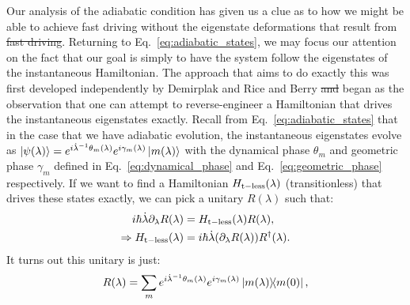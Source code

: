\documentclass[a4paper,oneside,11pt]{book}
\newcommand{\adj}[1]{#1^{\dagger}}
\newcommand{\dotlambda}{\dot{\lambda}}
\providecommand{\DIFaddtex}[1]{{\protect\color{blue}\uwave{#1}}} %
\providecommand{\DIFdeltex}[1]{{\protect\color{red}\sout{#1}}}                      %
\providecommand{\DIFaddbegin}{} %
\providecommand{\DIFaddend}{} %
\providecommand{\DIFdelbegin}{} %
\providecommand{\DIFdelend}{} %
\providecommand{\DIFadd}[1]{\texorpdfstring{\DIFaddtex{#1}}{#1}} %
\providecommand{\DIFdel}[1]{\texorpdfstring{\DIFdeltex{#1}}{}} %
\newcommand{\DIFscaledelfig}{0.5}
\newlength{\DIFdelgraphicswidth} %
\newlength{\DIFdelgraphicsheight} %
\newcommand{\DIFaddincludegraphics}[2][]{{\color{blue}\fbox{\DIFOincludegraphics[#1]{#2}}}} %
\newcommand{\DIFdelincludegraphics}[2][]{%
\sbox{\DIFdelgraphicsbox}{\DIFOincludegraphics[#1]{#2}}%
\settoboxwidth{\DIFdelgraphicswidth}{\DIFdelgraphicsbox} %
\settoboxtotalheight{\DIFdelgraphicsheight}{\DIFdelgraphicsbox} %
\scalebox{\DIFscaledelfig}{%
\parbox[b]{\DIFdelgraphicswidth}{\usebox{\DIFdelgraphicsbox}\\[-\baselineskip] \rule{\DIFdelgraphicswidth}{0em}}\llap{\resizebox{\DIFdelgraphicswidth}{\DIFdelgraphicsheight}{%
\setlength{\unitlength}{\DIFdelgraphicswidth}%
\begin{picture}(1,1)%
\thicklines\linethickness{2pt} %
{\color[rgb]{1,0,0}\put(0,0){\framebox(1,1){}}}%
{\color[rgb]{1,0,0}\put(0,0){\line( 1,1){1}}}%
{\color[rgb]{1,0,0}\put(0,1){\line(1,-1){1}}}%
\end{picture}%
}\hspace*{3pt}}} %
} %
\DeclareRobustCommand{\DIFaddbegin}{\DIFOaddbegin \let\includegraphics\DIFaddincludegraphics} %
\DeclareRobustCommand{\DIFaddend}{\DIFOaddend \let\includegraphics\DIFOincludegraphics} %
\DeclareRobustCommand{\DIFdelbegin}{\DIFOdelbegin \let\includegraphics\DIFdelincludegraphics} %
\DeclareRobustCommand{\DIFdelend}{\DIFOaddend \let\includegraphics\DIFOincludegraphics} %
\begin{document}
    Our analysis of the adiabatic condition has given us a clue as to how we might be able to achieve fast driving without the eigenstate deformations that result from \DIFdelbegin \DIFdel{fast driving}\DIFdelend \DIFaddbegin \DIFadd{it}\DIFaddend . Returning to Eq.~\eqref{eq:adiabatic_states}, we may focus our attention on the fact that our goal is simply to have the system follow the eigenstates of the instantaneous Hamiltonian. The approach that aims to do exactly this was first developed independently by Demirplak and Rice \cite{demirplak_adiabatic_2003} and Berry \cite{berry_transitionless_2009}\DIFdelbegin \DIFdel{and }\DIFdelend \DIFaddbegin \DIFadd{. It }\DIFaddend began as the observation that one can attempt to reverse-engineer a Hamiltonian that drives the instantaneous eigenstates exactly. Recall from Eq.~\eqref{eq:adiabatic_states} that in the case that we have adiabatic evolution, the instantaneous eigenstates evolve as $\ket{\psi(\lambda)} = e^{i \dotlambda^{-1} \theta_m(\lambda)}e^{i \gamma_m(\lambda)} \ket{m(\lambda)}$ with the dynamical phase $\theta_m$ and geometric phase $\gamma_m$ defined in Eq.~\eqref{eq:dynamical_phase} and Eq.~\eqref{eq:geometric_phase} respectively. If we want to find a Hamiltonian $H_{\rm t-less} (\lambda)$ (transitionless) that drives these states exactly, we can pick a unitary $R(\lambda)$ such that:
    \begin{equation}
        \DIFdelbegin %
\DIFdelend \DIFaddbegin \begin{aligned}
            i\hbar \dotlambda \partial_{\lambda} R(\lambda) &= H_{\rm t-less} (\lambda) R(\lambda), \\
            \Rightarrow H_{\rm t-less} (\lambda) &= i\hbar \dotlambda (\partial_{\lambda} R(\lambda)) \adj{R}(\lambda).\label{eq:H_t_less}
        \end{aligned}\DIFaddend 
    \end{equation}
    It turns out this unitary is just:
    \begin{equation}\label{eq:transitionless_unitary}
        R(\lambda) = \sum_m e^{i \dotlambda^{-1} \theta_m(\lambda)}e^{i \gamma_m(\lambda)} \dyad{m(\lambda)}{m(0)},
    \end{equation}
\end{document}
